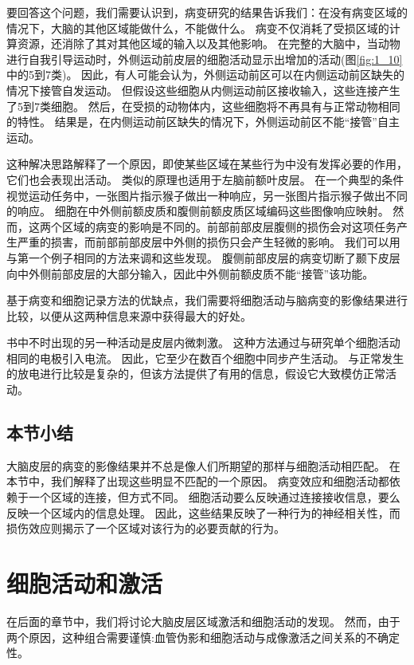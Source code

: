 \par
要回答这个问题，我们需要认识到，病变研究的结果告诉我们：在没有病变区域的情况下，大脑的其他区域能做什么，不能做什么。
病变不仅消耗了受损区域的计算资源，还消除了其对其他区域的输入以及其他影响。
在完整的大脑中，当动物进行自我引导运动时，外侧运动前皮层的细胞活动显示出增加的活动(图\ref{fig:1_10}中的5到7类)\cite{mushiake1991neuronal}。
因此，有人可能会认为，外侧运动前区可以在内侧运动前区缺失的情况下接管自发运动。
但假设这些细胞从内侧运动前区接收输入，这些连接产生了5到7类细胞。
然后，在受损的动物体内，这些细胞将不再具有与正常动物相同的特性。
结果是，在内侧运动前区缺失的情况下，外侧运动前区不能“接管”自主运动。

\par
这种解决思路解释了一个原因，即使某些区域在某些行为中没有发挥必要的作用，它们也会表现出活动。
类似的原理也适用于左脑前额叶皮层。
在一个典型的条件视觉运动任务中，一张图片指示猴子做出一种响应，另一张图片指示猴子做出不同的响应。
细胞在中外侧前额皮质和腹侧前额皮质区域编码这些图像响应映射\cite{asaad1998neural}。
然而，这两个区域的病变的影响是不同的。前部前部皮层腹侧的损伤会对这项任务产生严重的损害\cite{wang2000deficit}，而前部前部皮层中外侧的损伤只会产生轻微的影响\cite{petrides2019conditional}。
我们可以用与第一个例子相同的方法来调和这些发现。
腹侧前部皮层的病变切断了颞下皮层向中外侧前部皮层的大部分输入\cite{ungerleider1989projections}，因此中外侧前额皮质不能“接管”该功能。

\par
基于病变和细胞记录方法的优缺点，我们需要将细胞活动与脑病变的影像结果进行比较，以便从这两种信息来源中获得最大的好处。
\par
书中不时出现的另一种活动是皮层内微刺激。
这种方法通过与研究单个细胞活动相同的电极引入电流。
因此，它至少在数百个细胞中同步产生活动。
与正常发生的放电进行比较是复杂的，但该方法提供了有用的信息，假设它大致模仿正常活动。

\subsection{本节小结}
大脑皮层的病变的影像结果并不总是像人们所期望的那样与细胞活动相匹配。
在本节中，我们解释了出现这些明显不匹配的一个原因。
病变效应和细胞活动都依赖于一个区域的连接，但方式不同。
细胞活动要么反映通过连接接收信息，要么反映一个区域内的信息处理。
因此，这些结果反映了一种行为的神经相关性，而损伤效应则揭示了一个区域对该行为的必要贡献的行为。

\section{细胞活动和激活}
在后面的章节中，我们将讨论大脑皮层区域激活和细胞活动的发现。
然而，由于两个原因，这种组合需要谨慎:血管伪影和细胞活动与成像激活之间关系的不确定性。

